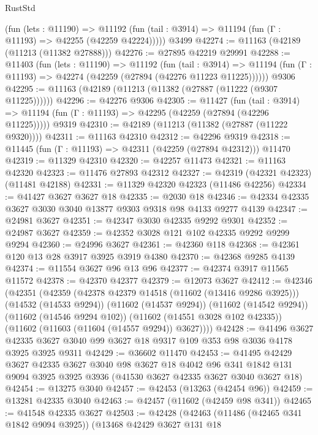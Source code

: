 \begin{lexlean}{RustStd}
\begin{coremodule}
      (fun (lets : @11190) =>
      @11192 (fun (tail : @3914) => @11194 (fun (Γ : @11193) => @42255 (@42259 @42224)))))
    @3499
@42274 := @11163 (@42189 (@11213 (@11382 @27888)))
@42276 := @27895 @42219 @29991
@42288 := @11403
    (fun (lets : @11190) =>
    @11192
      (fun (tail : @3914) =>
      @11194 (fun (Γ : @11193) => @42274 (@42259 (@27894 (@42276 @11223 @11225))))))
    @9306
@42295 := @11163 (@42189 (@11213 (@11382 (@27887 (@11222 (@9307 @11225))))))
@42296 := @42276 @9306
@42305 := @11427
    (fun (tail : @3914) => @11194 (fun (Γ : @11193) => @42295 (@42259 (@27894 (@42296 @11225)))))
    @9319
@42310 := @42189 (@11213 (@11382 (@27887 (@11222 @9320))))
@42311 := @11163 @42310
@42312 := @42296 @9319
@42318 := @11445 (fun (Γ : @11193) => @42311 (@42259 (@27894 @42312))) @11470
@42319 := @11329 @42310
@42320 := @42257 @11473
@42321 := @11163 @42320
@42323 := @11476 @27893 @42312
@42327 := @42319 (@42321 @42323) (@11481 @42188)
@42331 := @11329 @42320 @42323 (@11486 @42256)
@42334 := @41427 @3627 @3627 @18
@42335 := @2030 @18
@42346 := @42334 @42335 @3627 @3030 @3040 @13877 @9303 @9318 @98 @4133 @9277 @4139
@42347 := @24981 @3627
@42351 := @42347 @3030 @42335 @9292 @9301
@42352 := @24987 @3627
@42359 := @42352 @3028 @121 @102 @42335 @9292 @9299 @9294
@42360 := @24996 @3627
@42361 := @42360 @118
@42368 := @42361 @120 @13 @28 @3917 @3925 @3919 @4380
@42370 := @42368 @9285 @4139
@42374 := @11554 @3627 @96 @13 @96
@42377 := @42374 @3917 @11565 @11572
@42378 := @42370 @42377
@42379 := @12073 @3627
@42412 := @42346
    (@42351
      (@42359
        (@42378 @42379 @14518 (@11602 (@13416 @9286 @3925)))
        (@14532 (@14533 @9294))
        (@11602 (@14537 @9294))
        (@11602 (@14542 @9294))
        (@11602 (@14546 @9294 @102))
        (@11602 (@14551 @3028 @102 @42335))
        (@11602 (@11603 (@11604 (@14557 @9294)) @3627))))
@42428 := @41496
    @3627
    @42335
    @3627
    @3040
    @99
    @3627
    @18
    @9317
    @109
    @353
    @98
    @3036
    @4178
    @3925
    @3925
    @9311
@42429 := @36602 @11470
@42453 := @41495
    @42429
    @3627
    @42335
    @3627
    @3040
    @98
    @3627
    @18
    @4042
    @96
    @341
    @1842
    @131
    @9094
    @3925
    @3925
    @3936
    (@41530 @3627 @42335 @3627 @3040 @3627 @18)
@42454 := @13275 @3040
@42457 := @42453 (@13263 (@42454 @96))
@42459 := @13281 @42335 @3040
@42463 := @42457 (@11602 (@42459 @98 @341))
@42465 := @41548 @42335 @3627
@42503 := @42428
    (@42463
      (@11486 (@42465 @341 @1842 @9094 @3925))
      (@13468
        @42429
        @3627
        @131
        @18

\end{coremodule}
\end{lexlean}
